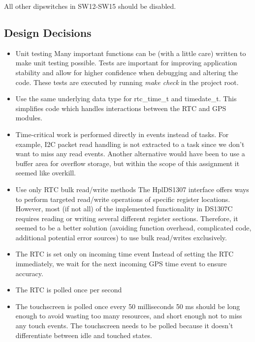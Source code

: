 \documentclass[12pt,a4paper,titlepage,oneside]{article}
\begin{document}
All other dipswitches in SW12-SW15 should be disabled.

\subsection{Design Decisions}

\begin{itemize}

\item Unit testing
    Many important functions can be (with a little care) written to make unit
    testing possible. Tests are important for improving application stability
    and allow for higher confidence when debugging and altering the code. These
    tests are executed by running \emph{make check} in the project root.

\item Use the same underlying data type for rtc\_time\_t and timedate\_t.
    This simplifies code which handles interactions between the RTC and GPS
    modules.

\item Time-critical work is performed directly in events instead of tasks.
    For example, I2C packet read handling is not extracted to a task since we
    don't want to miss any read events. Another alternative would have been to
    use a buffer area for overflow storage, but within the scope of this
    assignment it seemed like overkill.

\item Use only RTC bulk read/write methods
    The HplDS1307 interface offers ways to perform targeted read/write
    operations of specific register locations. However, most (if not all) of
    the implemented functionality in DS1307C requires reading or writing
    several different register sections. Therefore, it seemed to be a better
    solution (avoiding function overhead, complicated code, additional
    potential error sources) to use bulk read/writes exclusively.

\item The RTC is set only on incoming time event
    Instead of setting the RTC immediately, we wait for the next incoming GPS
    time event to ensure accuracy.

\item The RTC is polled once per second

\item The touchscreen is polled once every 50 milliseconds
    50 ms should be long enough to avoid wasting too many resources, and short
    enough not to miss any touch events. The touchscreen needs to be polled
    because it doesn't differentiate between idle and touched states.


\end{itemize}
\end{document}
